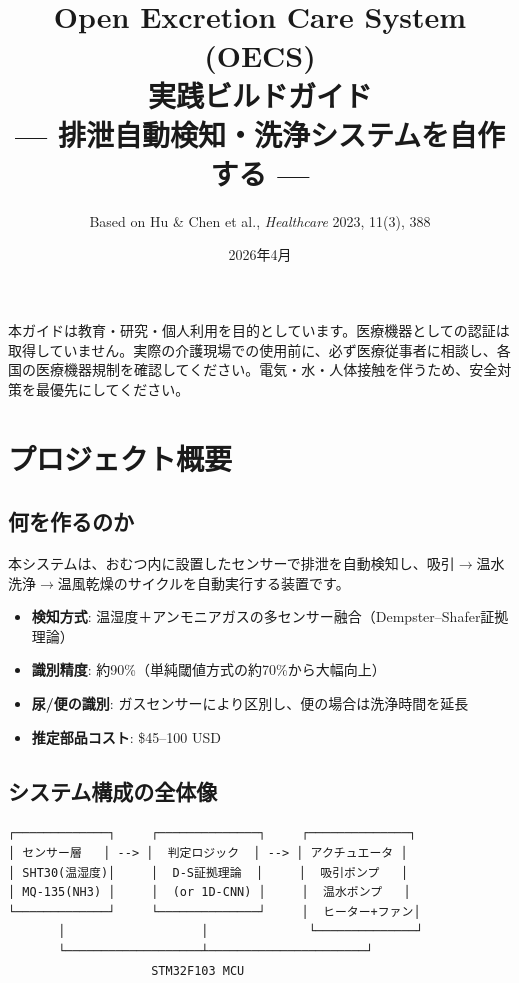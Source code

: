 \documentclass[a4paper,11pt]{article}
\title{\vspace{-10mm}\sffamily\bfseries
Open Excretion Care System (OECS)\\[4pt]
\Large 実践ビルドガイド\\[2pt]
\large --- 排泄自動検知・洗浄システムを自作する ---}
\author{Based on Hu \& Chen et al., \textit{Healthcare} 2023, 11(3), 388}
\date{2026年4月}
\begin{document}
\maketitle
\thispagestyle{fancy}

\begin{warningbox}
本ガイドは教育・研究・個人利用を目的としています。医療機器としての認証は取得していません。実際の介護現場での使用前に、必ず医療従事者に相談し、各国の医療機器規制を確認してください。電気・水・人体接触を伴うため、安全対策を最優先にしてください。
\end{warningbox}

\vspace{3mm}
\tableofcontents
\newpage

\section{プロジェクト概要}

\subsection{何を作るのか}

本システムは、おむつ内に設置したセンサーで排泄を自動検知し、吸引$\to$温水洗浄$\to$温風乾燥のサイクルを自動実行する装置です。

\begin{itemize}[leftmargin=2em]
  \item \textbf{検知方式}: 温湿度＋アンモニアガスの多センサー融合（Dempster--Shafer証拠理論）
  \item \textbf{識別精度}: 約90\%（単純閾値方式の約70\%から大幅向上）
  \item \textbf{尿/便の識別}: ガスセンサーにより区別し、便の場合は洗浄時間を延長
  \item \textbf{推定部品コスト}: \$45--100 USD
\end{itemize}

\subsection{システム構成の全体像}

\begin{verbatim}
┌─────────────┐     ┌──────────────┐     ┌──────────────┐
│ センサー層   │ --> │  判定ロジック  │ --> │ アクチュエータ │
│ SHT30(温湿度)│     │  D-S証拠理論  │     │  吸引ポンプ   │
│ MQ-135(NH3) │     │  (or 1D-CNN) │     │  温水ポンプ   │
└─────────────┘     └──────────────┘     │  ヒーター+ファン│
       │                   │              └──────────────┘
       └───────────────────┴──────────────────────┘
                    STM32F103 MCU
\end{verbatim}
\end{document}
